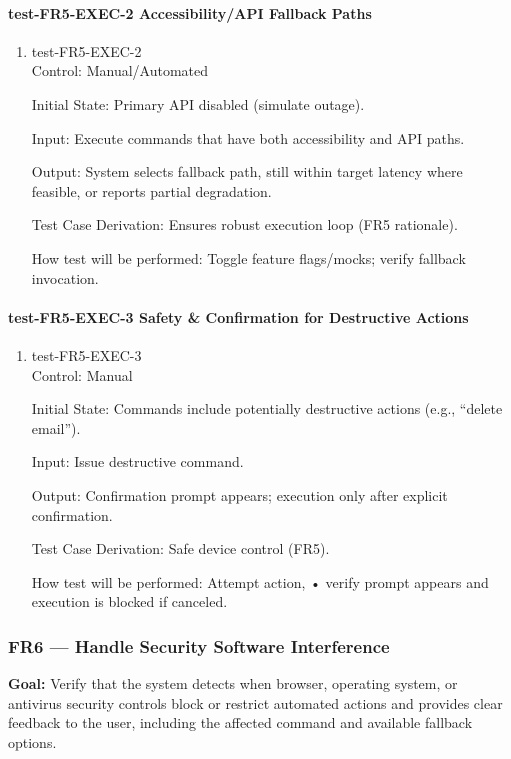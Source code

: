 \documentclass[12pt, titlepage]{article}
\begin{document}
\paragraph{test-FR5-EXEC-2 Accessibility/API Fallback Paths}

\begin{enumerate}
\item{test-FR5-EXEC-2\\}
Control: Manual/Automated

Initial State: Primary API disabled (simulate outage).

Input: Execute commands that have both accessibility and API paths.

Output: System selects fallback path, still within target latency where feasible, or reports partial degradation.

Test Case Derivation: Ensures robust execution loop (FR5 rationale).

How test will be performed: Toggle feature flags/mocks; verify fallback invocation.
\end{enumerate}

\paragraph{test-FR5-EXEC-3 Safety \& Confirmation for Destructive Actions}

\begin{enumerate}
\item{test-FR5-EXEC-3\\}
Control: Manual

Initial State: Commands include potentially destructive actions (e.g., “delete email”).

Input: Issue destructive command.

Output: Confirmation prompt appears; execution only after explicit confirmation.

Test Case Derivation: Safe device control (FR5).

How test will be performed: Attempt action, 
• verify prompt appears and execution is blocked if canceled.
\end{enumerate}

\subsubsection{FR6 — Handle Security Software Interference}

\textbf{Goal:} Verify that the system detects when browser, operating system, or antivirus security controls block or restrict automated actions and provides clear feedback to the user, including the affected command and available fallback options.
\end{document}
